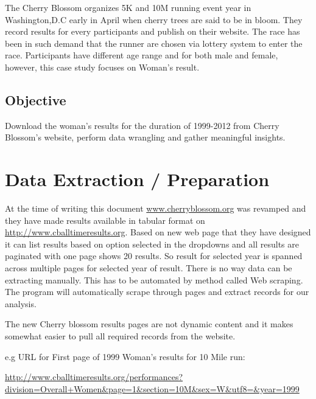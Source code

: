 \documentclass[
]{article}
\begin{document}
The Cherry Blossom organizes 5K and 10M running event year in
Washington,D.C early in April when cherry trees are said to be in bloom.
They record results for every participants and publish on their website.
The race has been in such demand that the runner are chosen via lottery
system to enter the race. Participants have different age range and for
both male and female, however, this case study focuses on Woman's
result.

\hypertarget{objective}{%
\subsection{Objective}\label{objective}}

Download the woman's results for the duration of 1999-2012 from Cherry
Blossom's website, perform data wrangling and gather meaningful
insights.

\newpage

\hypertarget{data-extraction-preparation}{%
\section{Data Extraction /
Preparation}\label{data-extraction-preparation}}

At the time of writing this document
\href{http://www.cherryblossom.org/}{www.cherryblossom.org} was revamped
and they have made results available in tabular format on
\href{http://www.cballtimeresults.org/performances}{http://www.cballtimeresults.org}.
Based on new web page that they have designed it can list results based
on option selected in the dropdowns and all results are paginated with
one page shows 20 results. So result for selected year is spanned across
multiple pages for selected year of result. There is no way data can be
extracting manually. This has to be automated by method called Web
scraping. The program will automatically scrape through pages and
extract records for our analysis.

The new Cherry blossom results pages are not dynamic content and it
makes somewhat easier to pull all required records from the website.

e.g URL for First page of 1999 Woman's results for 10 Mile run:

\url{http://www.cballtimeresults.org/performances?division=Overall+Women\&page=1\&section=10M\&sex=W\&utf8=\&year=1999}
\end{document}
